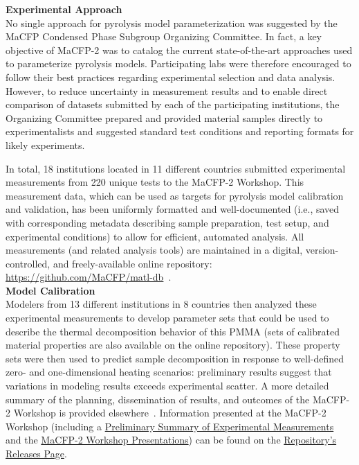 \documentclass[12pt,demo]{article}
\begin{document}
\textbf{Experimental Approach}\\
No single approach for pyrolysis model parameterization was suggested by the MaCFP Condensed Phase Subgroup Organizing Committee. In fact, a key objective of MaCFP-2 was to catalog the current state-of-the-art approaches used to parameterize pyrolysis models. Participating labs were therefore encouraged to follow their best practices regarding experimental selection and data analysis. However, to reduce uncertainty in measurement results and to enable direct comparison of datasets submitted by each of the participating institutions, the Organizing Committee prepared and provided material samples directly to experimentalists and suggested standard test conditions and reporting formats for likely experiments.  

In total, 18 institutions located in 11 different countries submitted experimental measurements from 220 unique tests to the MaCFP-2 Workshop. This measurement data, which can be used as targets for pyrolysis model calibration and validation, has been uniformly formatted and well-documented (i.e., saved with corresponding metadata describing sample preparation, test setup, and experimental conditions) to allow for efficient, automated analysis. All measurements (and related analysis tools) are maintained in a digital, version-controlled, and freely-available online repository: \url{https://github.com/MaCFP/matl-db}~\cite{MaCFP-cond-db}. \\

\textbf{Model Calibration}\\
Modelers from 13 different institutions in 8 countries then analyzed these experimental measurements to develop parameter sets that could be used to describe the thermal decomposition behavior of this PMMA (sets of calibrated material properties are also available on the online repository). These property sets were then used to predict sample decomposition in response to well-defined zero- and one-dimensional heating scenarios: preliminary results suggest that variations in modeling results exceeds experimental scatter.  A more detailed summary of the planning, dissemination of results, and outcomes of the MaCFP-2 Workshop is provided elsewhere~\cite{Leventon2022ASTM}. Information presented at the MaCFP-2 Workshop (including a \href{https://github.com/MaCFP/matl-db/releases/tag/v1.0.0}{Preliminary Summary of Experimental Measurements}~\cite{PreliminarySummary} and the \href{https://github.com/MaCFP/matl-db/releases/tag/v1.1.0}{MaCFP-2 Workshop Presentations}) can be found on the 
\href{https://github.com/MaCFP/matl-db/releases}{Repository's Releases Page}.
\end{document}

